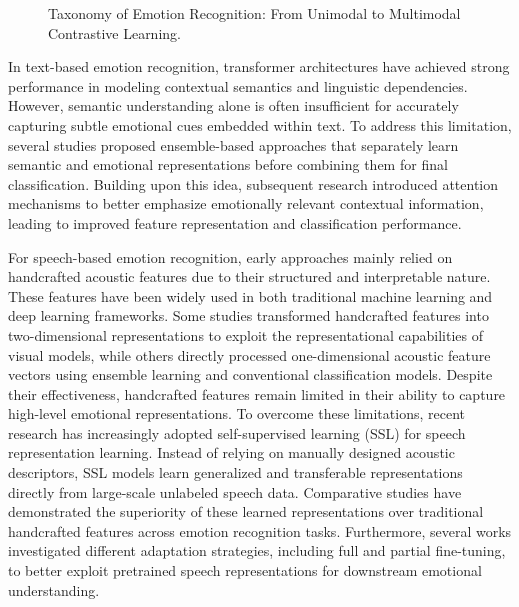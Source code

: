 \begin{figure}
	\caption{Taxonomy of Emotion Recognition: From Unimodal to Multimodal Contrastive Learning.}
	\label{fig:RW-taxonomy}
\end{figure}


In text-based emotion recognition, transformer architectures have achieved strong performance in modeling contextual semantics and linguistic dependencies\cite{Cortiz2022}. However, semantic understanding alone is often insufficient for accurately capturing subtle emotional cues embedded within text. To address this limitation, several studies proposed ensemble-based approaches that separately learn semantic and emotional representations before combining them for final classification\cite{Batbaatar2019}. Building upon this idea, subsequent research introduced attention mechanisms to better emphasize emotionally relevant contextual information, leading to improved feature representation and classification performance\cite{Han2023}.

For speech-based emotion recognition, early approaches mainly relied on handcrafted acoustic features due to their structured and interpretable nature. These features have been widely used in both traditional machine learning and deep learning frameworks. Some studies transformed handcrafted features into two-dimensional representations to exploit the representational capabilities of visual models\cite{Mustaqeem2020, Venkataramanan2019}, while others directly processed one-dimensional acoustic feature vectors using ensemble learning and conventional classification models\cite{Novais2023}. Despite their effectiveness, handcrafted features remain limited in their ability to capture high-level emotional representations.
To overcome these limitations, recent research has increasingly adopted self-supervised learning (SSL) for speech representation learning. Instead of relying on manually designed acoustic descriptors, SSL models learn generalized and transferable representations directly from large-scale unlabeled speech data. Comparative studies have demonstrated the superiority of these learned representations over traditional handcrafted features across emotion recognition tasks\cite{Atmaja2022}. Furthermore, several works investigated different adaptation strategies, including full and partial fine-tuning, to better exploit pretrained speech representations for downstream emotional understanding\cite{Yingzhi2021}.

